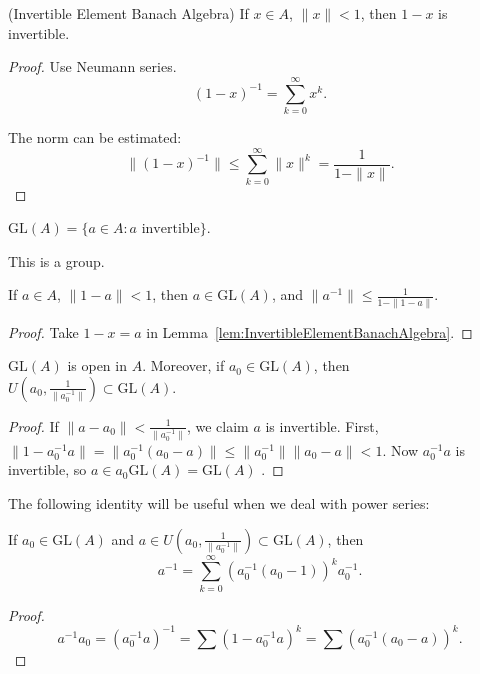 \begin{lemma}(Invertible Element Banach Algebra)
	\label{lem:InvertibleElementBanachAlgebra}
	If $x \in A$, $\|x\| < 1$, then $1 - x$ is invertible.
\end{lemma}
\begin{proof}
	Use Neumann series.
	\[
		(1 - x)^{-1} = \sum_{k = 0}^{\infty } x^k
	.\] 

	The norm can be estimated:
	\[
		\|( 1 - x)^{-1}\| \le  \sum_{k = 0}^\infty \|x\|^k = \frac{1}{1 - \|x\|}
	.\] 
\end{proof}

\begin{notation}
	$\text{GL}(A) = \{a \in A: a \text{ invertible}\} $.

	This is a group.
\end{notation}

\begin{corollary}
	\label{cor:InvertibleElementsBanachAlgebra}
	If $a \in A$, $\|1 - a\|< 1$, then $a \in \text{GL}(A)$, and $\|a^{-1}\|\le \frac{1}{1 - \|1 - a\|}$.
\end{corollary}
\begin{proof}
	Take $1 - x = a$ in Lemma~\ref{lem:InvertibleElementBanachAlgebra}.
\end{proof}

\begin{proposition}
	\label{prop:GLOpen}
	$\text{GL}(A)$ is open in $A$. Moreover, if $a_0 \in \text{GL}(A)$, then $U(a_0, \frac{1}{\|a_0^{-1}\|}) \subset \text{GL}(A)$.
\end{proposition}
\begin{proof}
	If $\|a - a_0\| < \frac{1}{\|a_0^{-1}\|}$, we claim $a$ is invertible. First, $\|1 - a_0^{-1} a\| = \|a_0^{-1} (a_0 - a)\|\le \|a_0^{-1}\| \|a_0 - a\|< 1 $.
	Now $a_0^{-1} a$ is invertible, so $a \in a_0 \text{GL}(A) = \text{GL}(A)$ .
\end{proof}

	The following identity will be useful when we deal with power series:
\begin{corollary}[InverseFormula]
	\label{cor:InverseFormula}
	
	If $a_0 \in \text{GL}(A)$ and $a \in U(a_0, \frac{1}{\|a_0^{-1}\|}) \subset \text{GL}(A)$, then
\[
		a^{-1} = \sum_{k = 0}^\infty \left( a_0^{-1} (a_0 - 1) \right) ^k a_0^{-1}
	.\]
\end{corollary}
\begin{proof}
	\[
		a^{-1}a_0 = (a_0^{-1} a)^{-1} = \sum (1 - a_0^{-1} a)^k = \sum \left( a_0^{-1}  (a_0 - a) \right) ^k
	.\] 
\end{proof}


